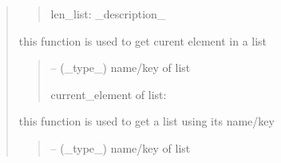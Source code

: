 \documentclass[letterpaper,10pt,english]{sphinxmanual}
\begin{document}
\begin{quote}
\begin{savenotes}
\begin{fulllineitems}
\begin{savenotes}
\begin{fulllineitems}
\begin{quote}
\begin{description}
\sphinxAtStartPar
len\_list: \_description\_

\end{description}\end{quote}

\end{fulllineitems}\end{savenotes}


\begin{savenotes}\begin{fulllineitems}
\label{\detokenize{setting/utils/move_on_list:oxin.utils.move_on_list.moveOnList.get_current}}
\pysigstartsignatures
{}
\pysigstopsignatures
\sphinxAtStartPar
this function is used to get curent element in a list
\begin{quote}\begin{description}
\sphinxAtStartPar
{} – (\_type\_) name/key of list

\sphinxAtStartPar
current\_element of list:

\end{description}\end{quote}

\end{fulllineitems}\end{savenotes}


\begin{savenotes}\begin{fulllineitems}
\label{\detokenize{setting/utils/move_on_list:oxin.utils.move_on_list.moveOnList.get_list}}
\pysigstartsignatures
{}
\pysigstopsignatures
\sphinxAtStartPar
this function is used to get a list using its name/key
\begin{quote}\begin{description}
\sphinxAtStartPar
{} – (\_type\_) name/key of list


\end{description}
\end{quote}
\end{fulllineitems}
\end{savenotes}
\end{fulllineitems}
\end{savenotes}
\end{quote}
\end{document}
